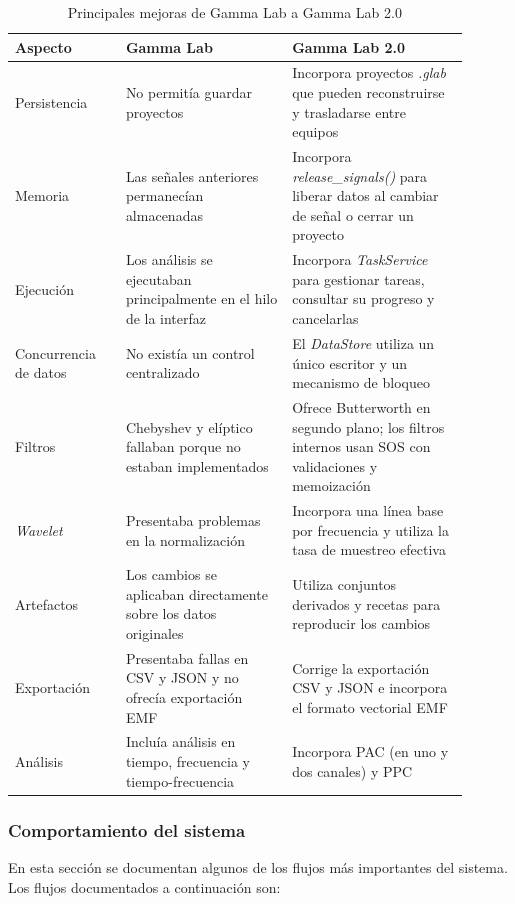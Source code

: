 \documentclass[12pt,letterpaper,oneside]{article}
\begin{document}
\begin{table}[H]
\centering
\small
\begin{tabular}{|p{0.22\linewidth}|p{0.33\linewidth}|p{0.35\linewidth}|}
\hline
\textbf{Aspecto} & \textbf{Gamma Lab} & \textbf{Gamma Lab 2.0} \\ \hline
Persistencia & No permitía guardar proyectos & Incorpora proyectos \textit{.glab} que pueden reconstruirse y trasladarse entre equipos \\ \hline
Memoria & Las señales anteriores permanecían almacenadas & Incorpora \textit{release\_signals()} para liberar datos al cambiar de señal o cerrar un proyecto \\ \hline
Ejecución & Los análisis se ejecutaban principalmente en el hilo de la interfaz & Incorpora \textit{TaskService} para gestionar tareas, consultar su progreso y cancelarlas \\ \hline
Concurrencia de datos & No existía un control centralizado & El \textit{DataStore} utiliza un único escritor y un mecanismo de bloqueo \\ \hline
Filtros & Chebyshev y elíptico fallaban porque no estaban implementados & Ofrece Butterworth en segundo plano; los filtros internos usan SOS con validaciones y memoización \\ \hline
\textit{Wavelet} & Presentaba problemas en la normalización & Incorpora una línea base por frecuencia y utiliza la tasa de muestreo efectiva \\ \hline
Artefactos & Los cambios se aplicaban directamente sobre los datos originales & Utiliza conjuntos derivados y recetas para reproducir los cambios \\ \hline
Exportación & Presentaba fallas en CSV y JSON y no ofrecía exportación EMF & Corrige la exportación CSV y JSON e incorpora el formato vectorial EMF \\ \hline
Análisis & Incluía análisis en tiempo, frecuencia y tiempo-frecuencia & Incorpora PAC (en uno y dos canales) y PPC \\ \hline
\end{tabular}
\caption{Principales mejoras de Gamma Lab a Gamma Lab 2.0}
\label{tab:avances}
\end{table}

\subsubsection{Comportamiento del sistema}

En esta sección se documentan algunos de los flujos más importantes del sistema.
Los flujos documentados a continuación son:
\end{document}
